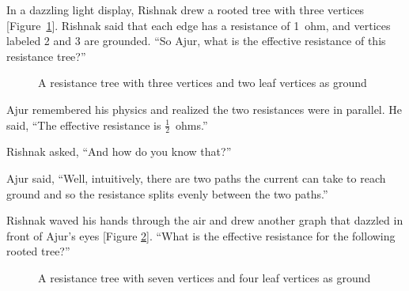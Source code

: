 In a dazzling light display, Rishnak drew a rooted tree with three vertices [Figure~\ref{t3}]. Rishnak said that each edge has a resistance of 1~ohm, and vertices labeled 2 and 3 are grounded. ``So Ajur, what is the effective resistance of this resistance tree?''

\begin{figure}
\begin{center}


\caption{A resistance tree with three vertices and two leaf vertices as ground}\label{t3}
\end{center}
\end{figure}


Ajur remembered his physics and realized the two resistances were in parallel. He said, ``The effective resistance is $\frac{1}{2}$~ohms.''

Rishnak asked, ``And how do you know that?''

Ajur said, ``Well, intuitively, there are two paths the current can take to reach ground and so the resistance splits evenly between the two paths.''

Rishnak waved his hands through the air and drew another graph that dazzled in front of Ajur's eyes [Figure \ref{t4}].  ``What is the effective resistance for the following rooted tree?''
\begin{figure}
\begin{center}


\caption{A resistance tree with seven vertices and four leaf vertices as ground}\label{t4}
\end{center}
\end{figure}

